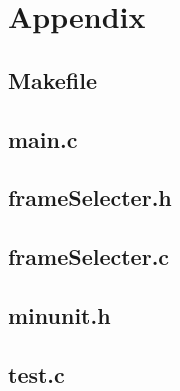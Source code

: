 \section{Appendix}

\subsection{Makefile}

\pagebreak

\subsection{main.c}

\pagebreak

\subsection{frameSelecter.h}

\pagebreak

\subsection{frameSelecter.c}

\pagebreak

\subsection{minunit.h}

\pagebreak

\subsection{test.c}

\pagebreak